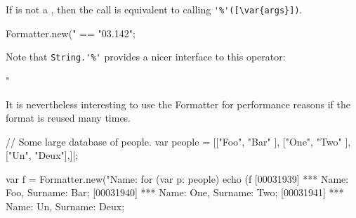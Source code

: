 \begin{urbiscriptapi}
  If  is not a , then the call is equivalent
  to calling \lstinline|'%'([\var{args}])|.
\begin{urbiassert}
Formatter.new("%
       == "03.142";
\end{urbiassert}

  Note that \lstinline|String.'%'| provides a nicer interface to this
  operator:
\begin{urbiassert}
"%
\end{urbiassert}

  It is nevertheless interesting to use the Formatter for performance
  reasons if the format is reused many times.
\begin{urbiscript}
// Some large database of people.
var people =
  [["Foo", "Bar" ],
   ["One", "Two" ],
   ["Un",  "Deux"],]|;

var f = Formatter.new("Name:%
for (var p: people)
  echo (f %
[00031939] *** Name:    Foo, Surname:    Bar;
[00031940] *** Name:    One, Surname:    Two;
[00031941] *** Name:     Un, Surname:   Deux;
\end{urbiscript}
\end{urbiscriptapi}

